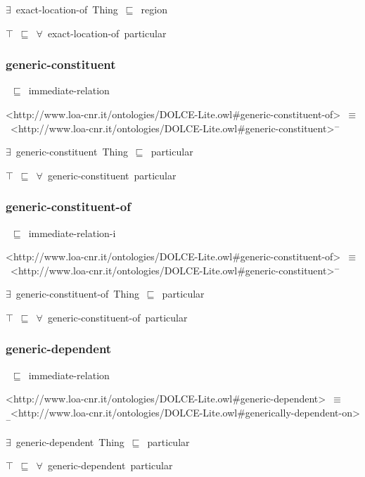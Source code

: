 \documentclass{article}
\begin{document}
\ensuremath{\exists}~exact-location-of~Thing~\ensuremath{\sqsubseteq}~region

\ensuremath{\top}~\ensuremath{\sqsubseteq}~\ensuremath{\forall}~exact-location-of~particular

\subsubsection*{generic-constituent}

~\ensuremath{\sqsubseteq}~immediate-relation

<http://www.loa-cnr.it/ontologies/DOLCE-Lite.owl#generic-constituent-of>~\ensuremath{\equiv}~<http://www.loa-cnr.it/ontologies/DOLCE-Lite.owl#generic-constituent>\ensuremath{^-}

\ensuremath{\exists}~generic-constituent~Thing~\ensuremath{\sqsubseteq}~particular

\ensuremath{\top}~\ensuremath{\sqsubseteq}~\ensuremath{\forall}~generic-constituent~particular

\subsubsection*{generic-constituent-of}

~\ensuremath{\sqsubseteq}~immediate-relation-i

<http://www.loa-cnr.it/ontologies/DOLCE-Lite.owl#generic-constituent-of>~\ensuremath{\equiv}~<http://www.loa-cnr.it/ontologies/DOLCE-Lite.owl#generic-constituent>\ensuremath{^-}

\ensuremath{\exists}~generic-constituent-of~Thing~\ensuremath{\sqsubseteq}~particular

\ensuremath{\top}~\ensuremath{\sqsubseteq}~\ensuremath{\forall}~generic-constituent-of~particular

\subsubsection*{generic-dependent}

~\ensuremath{\sqsubseteq}~immediate-relation

<http://www.loa-cnr.it/ontologies/DOLCE-Lite.owl#generic-dependent>~\ensuremath{\equiv}~<http://www.loa-cnr.it/ontologies/DOLCE-Lite.owl#generically-dependent-on>\ensuremath{^-}

\ensuremath{\exists}~generic-dependent~Thing~\ensuremath{\sqsubseteq}~particular

\ensuremath{\top}~\ensuremath{\sqsubseteq}~\ensuremath{\forall}~generic-dependent~particular
\end{document}
